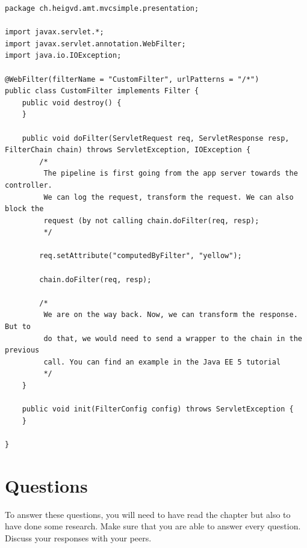 \vspace{10pt}
\begin{minipage}{\linewidth}
\begin{lstlisting}[frame=single]
package ch.heigvd.amt.mvcsimple.presentation;

import javax.servlet.*;
import javax.servlet.annotation.WebFilter;
import java.io.IOException;

@WebFilter(filterName = "CustomFilter", urlPatterns = "/*")
public class CustomFilter implements Filter {
    public void destroy() {
    }

    public void doFilter(ServletRequest req, ServletResponse resp, FilterChain chain) throws ServletException, IOException {
        /*
         The pipeline is first going from the app server towards the controller.
         We can log the request, transform the request. We can also block the 
         request (by not calling chain.doFilter(req, resp);
         */

        req.setAttribute("computedByFilter", "yellow");

        chain.doFilter(req, resp);

        /*
         We are on the way back. Now, we can transform the response. But to
         do that, we would need to send a wrapper to the chain in the previous 
         call. You can find an example in the Java EE 5 tutorial
         */
    }

    public void init(FilterConfig config) throws ServletException {
    }

}
\end{lstlisting}
\end{minipage}

\section{Questions}

To answer these questions, you will need to have read the chapter but also to have done some research. Make sure that you are able to answer every question. Discuss your responses with your peers.

